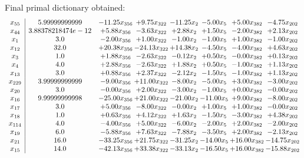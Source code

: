 \documentclass[8pt]{article}
\begin{document}
 Final primal dictionary obtained: 
\[\begin{array}{c| c c@{\hskip 2pt} c@{\hskip 2pt} c@{\hskip 2pt} c@{\hskip 2pt} c@{\hskip 2pt} c@{\hskip 2pt} }
 x_{55}   &  5.99999999999 & -11.25 x_{356} & +  9.75 x_{322} & -11.25 x_{2} & -5.00 x_{5} & +  5.00 x_{382} & -4.75 x_{202}\\
 x_{44}   &  3.88378218474e-12 & +  5.88 x_{356} & -3.63 x_{322} & +  2.88 x_{2} & +  1.50 x_{5} & -2.00 x_{382} & +  2.13 x_{202}\\
 x_{1}   &  3.0 & -2.00 x_{356} & +  1.00 x_{322} & -1.00 x_{2} & -1.00 x_{5} & +  1.00 x_{382} & -1.00 x_{202}\\
 x_{12}   &  32.0 & + 20.38 x_{356} & -24.13 x_{322} & + 14.38 x_{2} & -4.50 x_{5} & -4.00 x_{382} & +  4.63 x_{202}\\
 x_{3}   &  1.0 & +  1.88 x_{356} & -2.63 x_{322} & -0.12 x_{2} & +  0.50 x_{5} & -0.00 x_{382} & +  0.13 x_{202}\\
 x_{4}   &  4.0 & +  2.88 x_{356} & -2.63 x_{322} & +  1.88 x_{2} & +  0.50 x_{5} & -1.00 x_{382} & +  1.13 x_{202}\\
 x_{13}   &  3.0 & +  0.88 x_{356} & +  2.37 x_{322} & -2.12 x_{2} & -1.50 x_{5} & -1.00 x_{382} & +  1.13 x_{202}\\
 x_{229}   &  3.99999999999 & -9.00 x_{356} & + 11.00 x_{322} & -8.00 x_{2} & -5.00 x_{5} & +  3.00 x_{382} & -3.00 x_{202}\\
 x_{20}   &  3.0 & -0.00 x_{356} & +  2.00 x_{322} & -3.00 x_{2} & -1.00 x_{5} & +  0.00 x_{382} & -0.00 x_{202}\\
 x_{16}   &  9.99999999998 & -25.00 x_{356} & + 21.00 x_{322} & -21.00 x_{2} & -11.00 x_{5} & +  9.00 x_{382} & -8.00 x_{202}\\
 x_{17}   &  3.0 & +  5.00 x_{356} & -8.00 x_{322} & -0.00 x_{2} & +  1.00 x_{5} & +  1.00 x_{382} & -0.00 x_{202}\\
 x_{18}   &  1.0 & +  0.63 x_{356} & +  4.12 x_{322} & +  1.63 x_{2} & -1.50 x_{5} & -3.00 x_{382} & +  4.38 x_{202}\\
 x_{114}   &  4.0 & -4.00 x_{356} & +  5.00 x_{322} & -6.00 x_{2} & -2.00 x_{5} & +  2.00 x_{382} & -2.00 x_{202}\\
 x_{19}   &  6.0 & -5.88 x_{356} & +  7.63 x_{322} & -7.88 x_{2} & -3.50 x_{5} & +  2.00 x_{382} & -2.13 x_{202}\\
 x_{21}   &  16.0 & -33.25 x_{356} & + 21.75 x_{322} & -31.25 x_{2} & -14.00 x_{5} & + 16.00 x_{382} & -14.75 x_{202}\\
 x_{15}   &  14.0 & -42.13 x_{356} & + 33.38 x_{322} & -33.13 x_{2} & -16.50 x_{5} & + 16.00 x_{382} & -15.88 x_{202}\\

\end{array}\]
\end{document}
